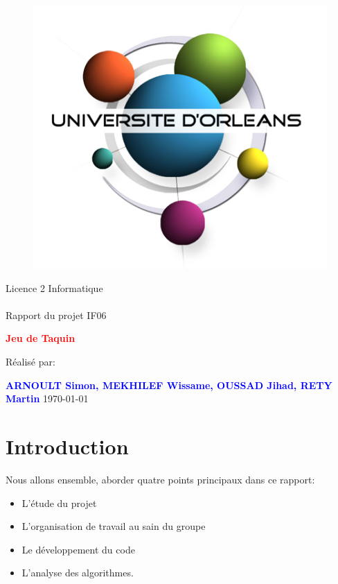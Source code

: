 ﻿\documentclass[a4paper,twoside,12pt]{report}
\begin{document}
\newpage
\pagestyle{empty}
%
\begin{figure}[H]
\includegraphics[width=0.2\linewidth]{Logo-univ-orleans.png}

\end{figure}
\vspace{2cm}
%
\begin{center}
{\Huge Licence 2 Informatique\\\ \\Rapport du projet IF06}
\par\vspace{1.4cm}

{\Huge\bf \textcolor{red}{\bf Jeu de Taquin}}
\par\vspace{1.6cm}

{\Large       R\'ealis\'e par:}
\par\vspace{1.3cm}
{\large\bf \textcolor{blue}{ARNOULT Simon, MEKHILEF Wissame, OUSSAD Jihad, RETY 
Martin}}
\vfill
\today
\end{center}
\newpage
\pagestyle{fancy}

\begin{abstract}
%
Nous avons le plaisir de vous pr\'esenter notre travail sur ce projet. Durant la 
deuxi\`eme ann\'ee de la l2 Informatique
\`a l'Universit\'e d'Orl\'eans, nous avons travaill\'e en groupe de quatre sur un projet 
de r\'esolution de Taquin.
\end{abstract}
 
\newpage
\tableofcontents
\listoffigures
\newpage

\chapter{Introduction}
Nous allons ensemble, aborder quatre points principaux dans ce rapport:
\begin{itemize}
\item L'\'etude du projet
\item L'organisation de travail au sain du groupe
\item Le d\'eveloppement du code
\item L'analyse des algorithmes.
\end{itemize}
%
\end{document}
